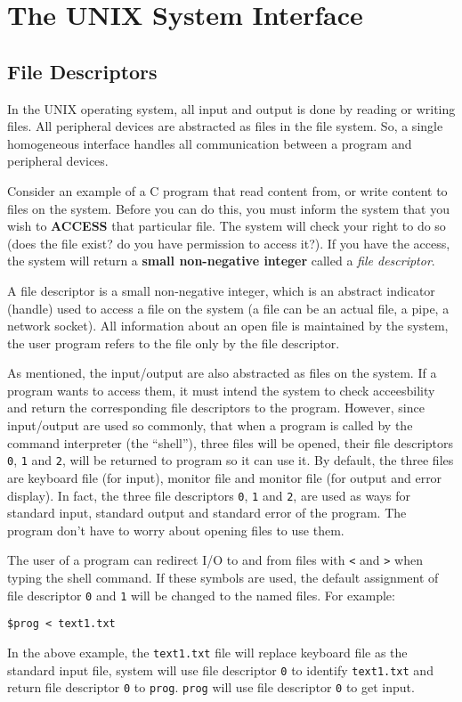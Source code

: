 \documentclass[11pt]{article}
\begin{document}
\section{The UNIX System Interface}
\label{sec:org5a1cef2}
\subsection{File Descriptors}
\label{sec:orgf94b902}
In the UNIX operating system, all input and output is done by reading or writing files. All peripheral devices are abstracted as files in the file system. So, a single homogeneous interface handles all communication between a program and peripheral devices.

Consider an example of a C program that read content from, or write content to files on the system. Before you can do this, you must inform the system that you wish to \textbf{ACCESS} that particular file. The system will check your right to do so (does the file exist? do you have permission to access it?). If you have the access, the system will return a \textbf{small non-negative integer} called a \emph{file descriptor}.

A file descriptor is a small non-negative integer, which is an abstract indicator (handle) used to access a file on the system (a file can be an actual file, a pipe, a network socket). All information about an open file is maintained by the system, the user program refers to the file only by the file descriptor.

As mentioned, the input/output are also abstracted as files on the system. If a program wants to access them, it must intend the system to check acceesbility and return the corresponding file descriptors to the program. However, since input/output are used so commonly, that when a program is called by the command interpreter (the ``shell''), three files will be opened, their file descriptors \texttt{0}, \texttt{1} and \texttt{2}, will be returned to program so it can use it. By default, the three files are keyboard file (for input), monitor file and monitor file (for output and error display). In fact, the three file descriptors \texttt{0}, \texttt{1} and \texttt{2}, are used as ways for standard input, standard output and standard error of the program. The program don't have to worry about opening files to use them.

The user of a program can redirect I/O to and from files with \texttt{<} and \texttt{>} when typing the shell command. If these symbols are used, the default assignment of file descriptor \texttt{0} and \texttt{1} will be changed to the named files. For example:
\begin{Verbatim}[frame=single]
$prog < text1.txt
\end{Verbatim}
In the above example, the \texttt{text1.txt} file will replace keyboard file as the standard input file, system will use file descriptor \texttt{0} to identify \texttt{text1.txt} and return file descriptor \texttt{0} to \texttt{prog}. \texttt{prog} will use file descriptor \texttt{0} to get input.
\end{document}
